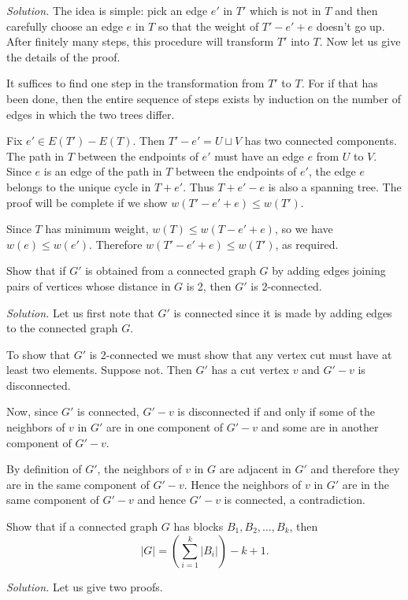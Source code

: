 \documentclass[10pt,reqno]{amsart}
\begin{document}
\begin{outline}[enumerate]
\medskip
\noindent \emph{Solution.}
The idea is simple: pick an edge $e'$ in $T'$ which is not in $T$ and then
carefully choose an edge $e$ in $T$ so that the weight of $T'-e'+e$ doesn't go
up. After finitely many steps, this procedure will transform $T'$ into $T.$ Now
let us give the details of the proof.

It suffices to find one step in the transformation from $T'$ to $T$. For if
that has been done, then the entire sequence of steps exists by induction on
the number of edges in which the two trees differ.

Fix $e' \in E(T') - E(T)$. Then $T'-e' = U \sqcup V$ has two connected
components. The path in $T$ between the endpoints of $e'$ must have an edge $e$
from $U$ to $V$. Since $e$ is an edge of the path in $T$ between the endpoints
of $e'$, the edge $e$ belongs to the unique cycle in $T+e'$. Thus $T+e'-e$ is
also a spanning tree. The proof will be complete if we show \(w(T'-e'+e) \le
w(T').\)

Since $T$ has minimum weight, $w(T) \le w(T-e'+e)$, so we have $w(e) \le
w(e')$. Therefore $w(T'-e'+e) \le w(T')$, as required.

\medskip

\medskip
\1 Show that if $G'$ is obtained from a connected graph $G$ by adding edges
joining pairs of vertices whose distance in $G$ is 2, then $G'$ is 2-connected.

\medskip
\noindent \emph{Solution.} Let us first note that $G'$ is connected since it is
made by adding edges to the connected graph $G.$

To show that $G'$ is 2-connected we must show that any vertex cut must have at
least two elements. Suppose not. Then $G'$ has a cut vertex $v$ and $G'-v$ is
disconnected.

Now, since $G'$ is connected, $G'-v$ is disconnected if and only if some of the
neighbors of $v$ in $G'$ are in one component of $G'-v$ and some are in another
component of $G'-v$.

By definition of $G'$, the neighbors of $v$ in $G$ are adjacent in $G'$ and
therefore they are in the same component of $G'-v$. Hence the neighbors of $v$
in $G'$ are in the same component of $G'-v$ and hence $G'-v$ is connected, a
contradiction.

\medskip

\medskip
\1 Show that if a connected graph $G$ has blocks $B_1,B_2,\dots,B_k$, then
\[|G| = \left( \sum_{i=1}^k |B_i| \right)- k + 1.\]

\medskip
\noindent \emph{Solution.} Let us give two proofs.


\end{outline}
\end{document}
